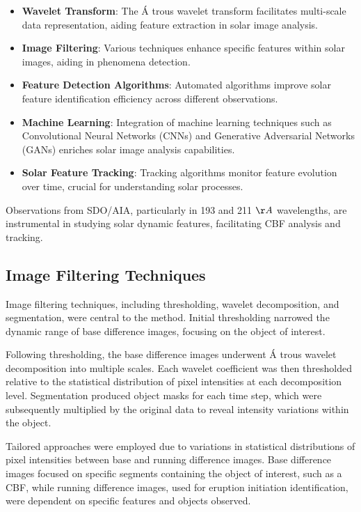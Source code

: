 \begin{itemize}
	\item \textbf{Wavelet Transform}: The \'A trous wavelet transform facilitates multi-scale data representation, aiding feature extraction in solar image analysis.
	
	\item \textbf{Image Filtering}: Various techniques enhance specific features within solar images, aiding in phenomena detection.
	
	\item \textbf{Feature Detection Algorithms}: Automated algorithms improve solar feature identification efficiency across different observations.
	
	\item \textbf{Machine Learning}: Integration of machine learning techniques such as Convolutional Neural Networks (CNNs) and Generative Adversarial Networks (GANs) enriches solar image analysis capabilities.
	
	\item \textbf{Solar Feature Tracking}: Tracking algorithms monitor feature evolution over time, crucial for understanding solar processes.
\end{itemize}

Observations from SDO/AIA, particularly in 193 and 211 $\AA$ wavelengths, are instrumental in studying solar dynamic features, facilitating CBF analysis and tracking.

\subsection{Image Filtering Techniques}
Image filtering techniques, including thresholding, wavelet decomposition, and segmentation, were central to the method. Initial thresholding narrowed the dynamic range of base difference images, focusing on the object of interest.

Following thresholding, the base difference images underwent \'A trous wavelet decomposition into multiple scales. Each wavelet coefficient was then thresholded relative to the statistical distribution of pixel intensities at each decomposition level. Segmentation produced object masks for each time step, which were subsequently multiplied by the original data to reveal intensity variations within the object.

Tailored approaches were employed due to variations in statistical distributions of pixel intensities between base and running difference images. Base difference images focused on specific segments containing the object of interest, such as a CBF, while running difference images, used for eruption initiation identification, were dependent on specific features and objects observed.

